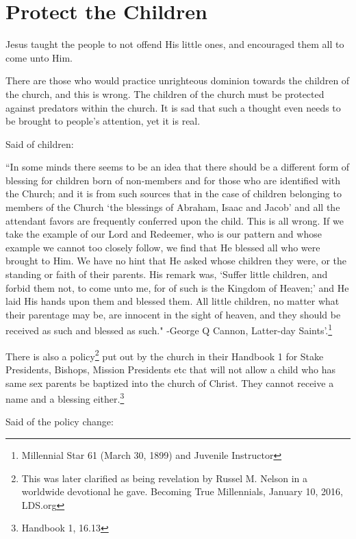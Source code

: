 \chapter{Protect the Children}

Jesus taught the people to not offend His little ones, and encouraged them all to
come unto Him.

There are those who would practice unrighteous dominion towards the children of the
church, and this is wrong. The children of the church must be protected against
predators within the church. It is sad that such a thought even needs to be brought
to people's attention, yet it is real.

Said of children:

\begin{displayquote}
``In some minds there seems to be an idea that there should be a different form of
blessing for children born of non-members and for those who are identified with the
Church; and it is from such sources that in the case of children belonging to members
of the Church `the blessings of Abraham, Isaac and Jacob' and all the attendant
favors are frequently conferred upon the child. This is all wrong. If we take the
example of our Lord and Redeemer, who is our pattern and whose example we cannot too
closely follow, we find that He blessed all who were brought to Him. We have no hint
that He asked whose children they were, or the standing or faith of their parents.
His remark was, `Suffer little children, and forbid them not, to come unto me, for of
such is the Kingdom of Heaven;' and He laid His hands upon them and blessed them. All
little children, no matter what their parentage may be, are innocent in the sight of
heaven, and they should be received as such and blessed as such." -George Q Cannon,
Latter-day Saints'.\footnote{Millennial Star 61 (March 30, 1899) and Juvenile
Instructor}
\end{displayquote}

There is also a policy\footnote{
This was later clarified as being revelation by Russel M. Nelson in a worldwide
devotional he gave. Becoming True Millennials, January 10, 2016, LDS.org
} put out by the church in their Handbook 1 for Stake Presidents, Bishops, Mission 
Presidents etc that will not allow a child who has same sex parents be baptized into 
the church of Christ. They cannot receive a name and a blessing 
either.\footnote{Handbook 1, 16.13}

Said of the policy change:

